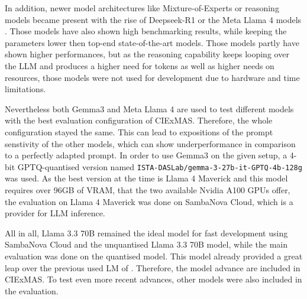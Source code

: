 \documentclass[a4paper,oneside,bibliography=totoc]{scrbook}
\begin{document}
In addition, newer model architectures like Mixture-of-Experts or reasoning models became present with the rise of Deepseek-R1 or the Meta Llama 4 models \cite{DeepSeekAI2025,MetaAI2025}. Those models have also shown high benchmarking results, while keeping the parameters lower then top-end state-of-the-art models. Those models partly have shown higher performances, but as the reasoning capability keeps looping over the LLM and produces a higher need for tokens as well as higher needs on resources, those models were not used for development due to hardware and time limitations.

Nevertheless both Gemma3 and Meta Llama 4 are used to test different models with the best evaluation configuration of CIExMAS. Therefore, the whole configuration stayed the same. This can lead to expositions of the prompt senstivity of the other models, which can show underperformance in comparison to a perfectly adapted prompt. In order to use Gemma3 on the given setup, a 4-bit GPTQ-quantised version named \texttt{ISTA-DASLab/gemma-3-27b-it-GPTQ-4b-128g} was used. As the best version at the time is Llama 4 Maverick and this model requires over 96GB of VRAM, that the two available Nvidia A100 GPUs offer, the evaluation on Llama 4 Maverick was done on SambaNova Cloud, which is a provider for LLM inference.

All in all, Llama 3.3 70B remained the ideal model for fast development using SambaNova Cloud and the unquantised Llama 3.3 70B model, while the main evaluation was done on the quantised model. This model already provided a great leap over the previous used \ac{LM} of \citet{Josifoski2023}. Therefore, the model advance are included in CIExMAS. To test even more recent advances, other models were also included in the evaluation.
\end{document}
